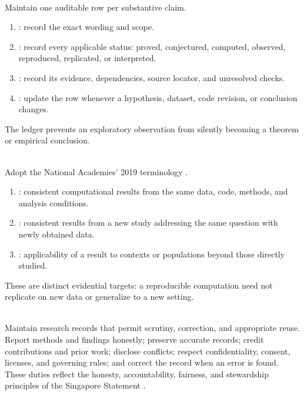 \begin{process} \label{proc:research-claim-ledger} \\
Maintain one auditable row per substantive claim.
\begin{enumerate}[label=(\roman*)]
\setlength{\itemsep}{0pt}
\item {}: record the exact wording and scope.
\item {}: record every applicable status: proved, conjectured, computed, observed, reproduced, replicated, or interpreted.
\item {}: record its evidence, dependencies, source locator, and unresolved checks.
\item {}: update the row whenever a hypothesis, dataset, code revision, or conclusion changes.
\end{enumerate}
The ledger prevents an exploratory observation from silently becoming a theorem or empirical conclusion.
\end{process}

\begin{convention} \label{conv:reproducibility-replicability-generalizability} \\
Adopt the National Academies' 2019 terminology \citep{nasem2019reproducibility}.
\begin{enumerate}[label=(\roman*)]
\setlength{\itemsep}{0pt}
\item {}: consistent computational results from the same data, code, methods, and analysis conditions.
\item {}: consistent results from a new study addressing the same question with newly obtained data.
\item {}: applicability of a result to contexts or populations beyond those directly studied.
\end{enumerate}
These are distinct evidential targets: a reproducible computation need not replicate on new data or generalize to a new setting.
\end{convention}

\begin{principle} \label{princ:research-integrity-record} \\
Maintain research records that permit scrutiny, correction, and appropriate reuse. Report methods and findings honestly; preserve accurate records; credit contributions and prior work; disclose conflicts; respect confidentiality, consent, licenses, and governing rules; and correct the record when an error is found. These duties reflect the honesty, accountability, fairness, and stewardship principles of the Singapore Statement \citep{singapore2010integrity}.
\end{principle}

